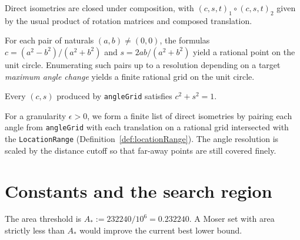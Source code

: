 \begin{definition}
  \label{def:isometry-compose}
  \leanok
  Direct isometries are closed under composition, with
  $(c, s, t)_1 \circ (c, s, t)_2$ given by the usual product of rotation
  matrices and composed translation.
\end{definition}

\begin{definition}
  \label{def:angleGrid}
  \leanok
  For each pair of naturals $(a, b) \ne (0, 0)$, the formulas
  $c = (a^2 - b^2)/(a^2 + b^2)$ and $s = 2ab/(a^2 + b^2)$ yield a rational
  point on the unit circle. Enumerating such pairs up to a resolution
  depending on a target \emph{maximum angle change} yields a finite
  rational grid on the unit circle.
\end{definition}

\begin{lemma}
  \label{lem:angleGrid-spec}
  \leanok
  Every $(c, s)$ produced by \texttt{angleGrid} satisfies $c^2 + s^2 = 1$.
\end{lemma}

\begin{definition}
  \label{def:discretizeIsometries}
  \leanok
  For a granularity $\epsilon > 0$, we form a finite list of direct
  isometries by pairing each angle from \texttt{angleGrid} with each
  translation on a rational grid intersected with the
  \texttt{LocationRange} (Definition~\ref{def:locationRange}). The angle
  resolution is scaled by the distance cutoff so that far-away points are
  still covered finely.
\end{definition}

\chapter{Constants and the search region}

\begin{definition}
  \label{def:areaThreshold}
  \leanok
  The area threshold is $A_* := 232240 / 10^6 = 0.232240$. A Moser set
  with area strictly less than $A_*$ would improve the current best lower
  bound.
\end{definition}

